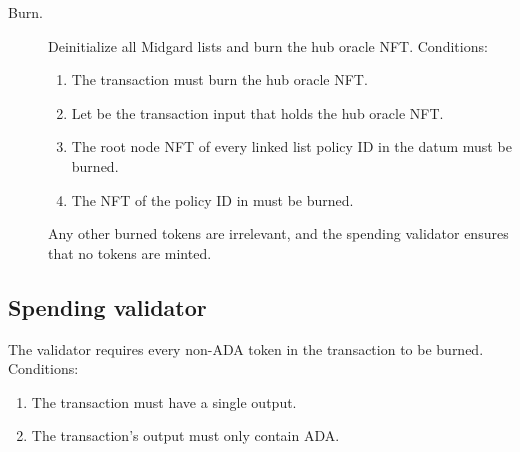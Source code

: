 \documentclass[../midgard.tex]{subfiles}
\begin{document}
\begin{description}
    \item[Burn.] Deinitialize all Midgard lists and burn the hub oracle NFT.
      Conditions:
        \begin{enumerate}
            \item The transaction must burn the hub oracle NFT.
            \item Let  be the transaction input that holds the hub oracle NFT.
            \item The root node NFT of every linked list policy ID in the  datum must be burned.
            \item The NFT of the  policy ID in  must be burned.
        \end{enumerate}
    Any other burned tokens are irrelevant, and the  spending validator ensures that no tokens are minted.
\end{description}

\subsection{Spending validator}
\label{h:hub-oracle-spending-validator}

The  validator requires every non-ADA token in the transaction to be burned.
Conditions:
\begin{enumerate}
    \item The transaction must have a single output.
    \item The transaction's output must only contain ADA.
\end{enumerate}
\end{document}
